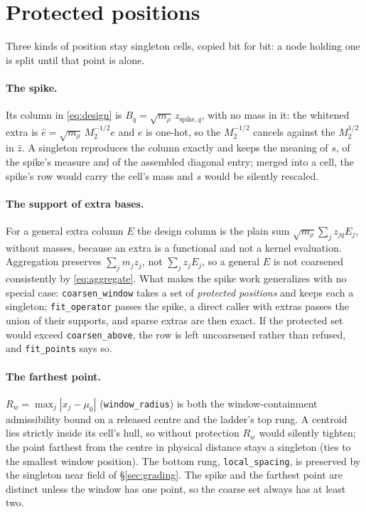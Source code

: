 \documentclass[11pt]{article}
\newcommand{\Mtwo}{M_2}
\newcommand{\what}[1]{\widehat{#1}}
\newcommand{\code}[1]{\texttt{#1}}
\begin{document}
\section{Protected positions}

Three kinds of position stay singleton cells, copied bit for bit: a node
holding one is split until that point is alone.

\paragraph{The spike.} Its column in \eqref{eq:design} is $B_q =
\sqrt{m_\rho}\, z_{\mathrm{spike}, q}$, with no mass in it: the whitened
extra is $\what e = \sqrt{m_\rho}\,\Mtwo^{-1/2} e$ and $e$ is one-hot, so the
$\Mtwo^{-1/2}$ cancels against the $\Mtwo^{1/2}$ in $\what z$. A singleton
reproduces the column exactly and keeps the meaning of $s$, of the spike's
measure and of the assembled diagonal entry; merged into a cell, the spike's
row would carry the cell's mass and $s$ would be silently rescaled.

\paragraph{The support of extra bases.} For a general extra column $E$ the
design column is the plain sum $\sqrt{m_\rho}\sum_j z_{jq} E_j$, without
masses, because an extra is a functional and not a kernel evaluation.
Aggregation preserves $\sum_j m_j z_j$, not $\sum_j z_j E_j$, so a general
$E$ is not coarsened consistently by \eqref{eq:aggregate}. What makes the
spike work generalizes with no special case: \code{coarsen\_window} takes a
set of \emph{protected positions} and keeps each a singleton;
\code{fit\_operator} passes the spike, a direct caller with extras passes the
union of their supports, and sparse extras are then exact. If the protected
set would exceed \code{coarsen\_above}, the row is left uncoarsened rather
than refused, and \code{fit\_points} says so.

\paragraph{The farthest point.} $R_w = \max_j |x_j - \mu_0|$
(\code{window\_radius}) is both the window-containment admissibility bound
on a released centre and the ladder's top rung. A centroid lies strictly
inside its cell's hull, so without protection $R_w$ would silently tighten;
the point farthest from the centre in physical distance stays a singleton
(ties to the smallest window position). The bottom rung,
\code{local\_spacing}, is preserved by the singleton near field of
\S\ref{sec:grading}. The spike and the farthest point are distinct unless
the window has one point, so the coarse set always has at least two.
\end{document}
